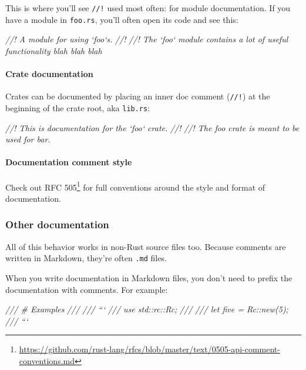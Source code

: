 \documentclass[a4paper,]{book}
\newenvironment{Shaded}{\begin{snugshade}}{\end{snugshade}}
\newcommand{\CommentTok}[1]{\textcolor[rgb]{0.56,0.35,0.01}{\textit{{#1}}}}
\renewcommand{\href}[2]{#2\footnote{\url{#1}}}
\let\oldparagraph\paragraph
\renewcommand{\paragraph}[1]{\oldparagraph{#1}\mbox{}}
\begin{document}
This is where you'll see \texttt{//!} used most often: for module
documentation. If you have a module in \texttt{foo.rs}, you'll often
open its code and see this:

\begin{Shaded}
\begin{Highlighting}[]
\CommentTok{//! A module for using `foo`s.}
\CommentTok{//!}
\CommentTok{//! The `foo` module contains a lot of useful functionality blah blah blah}
\end{Highlighting}
\end{Shaded}

\paragraph{Crate documentation}\label{crate-documentation}

Crates can be documented by placing an inner doc comment (\texttt{//!})
at the beginning of the crate root, aka \texttt{lib.rs}:

\begin{Shaded}
\begin{Highlighting}[]
\CommentTok{//! This is documentation for the `foo` crate.}
\CommentTok{//!}
\CommentTok{//! The foo crate is meant to be used for bar.}
\end{Highlighting}
\end{Shaded}

\paragraph{Documentation comment
style}\label{documentation-comment-style}

Check out
\href{https://github.com/rust-lang/rfcs/blob/master/text/0505-api-comment-conventions.md}{RFC
505} for full conventions around the style and format of documentation.

\subsubsection{Other documentation}\label{other-documentation}

All of this behavior works in non-Rust source files too. Because
comments are written in Markdown, they're often \texttt{.md} files.

When you write documentation in Markdown files, you don't need to prefix
the documentation with comments. For example:

\begin{Shaded}
\begin{Highlighting}[]
\CommentTok{/// # Examples}
\CommentTok{///}
\CommentTok{/// ```}
\CommentTok{/// use std::rc::Rc;}
\CommentTok{///}
\CommentTok{/// let five = Rc::new(5);}
\CommentTok{/// ```}
\end{Highlighting}
\end{Shaded}
\end{document}
